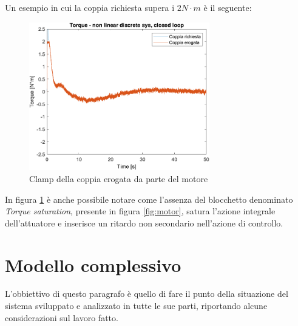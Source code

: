 Un esempio in cui la coppia richiesta supera i $2N\cdot{m}$ è il seguente:
\begin{figure}[H]
	\centering   	
	\includegraphics[width=0.7\textwidth]{Immagini/Torque.png}
	\caption{Clamp della coppia erogata da parte del motore}
	\label{fig:clamp_motore}
\end{figure}
In figura \ref{fig:clamp_motore} è anche possibile notare come l'assenza del blocchetto denominato \textit{Torque saturation}, presente in figura \ref{fig:motor}, satura l'azione integrale dell'attuatore e inserisce un ritardo non secondario nell'azione di controllo.

\section{Modello complessivo}
L'obbiettivo di questo paragrafo è quello di fare il punto della situazione del sistema sviluppato e analizzato in tutte le sue parti, riportando alcune considerazioni sul lavoro fatto.

